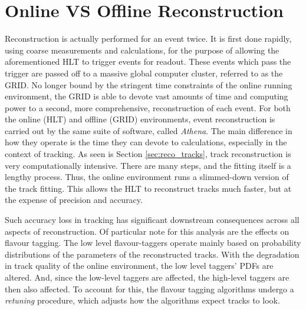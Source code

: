     \section{Online VS Offline Reconstruction}

        Reconstruction is actually performed for an event twice.
        It is first done rapidly, using coarse measurements and calculations,
            for the purpose of allowing the aforementioned HLT to trigger events for readout.
        These events which pass the trigger are passed off to a massive global computer cluster, referred to as the GRID.
        No longer bound by the stringent time constraints of the online running environment,
            the GRID is able to devote vast amounts of time and computing power to a second, 
            more comprehensive, reconstruction of each event.
        For both the online (HLT) and offline (GRID) environments, event reconstruction is carried out by the same suite of software,
            called \textit{Athena}.
        The main difference in how they operate is the time they can devote to calculations, especially in the context of tracking.
        As seen is Section \ref{sec:reco_tracks}, track reconstruction is very computationally intensive.
        There are many steps, and the fitting itself is a lengthy process.
        Thus, the online environment runs a slimmed-down version of the track fitting.
        This allows the HLT to reconstruct tracks much faster, but at the expense of precision and accuracy.

        Such accuracy loss in tracking has significant downstream consequences across all aspects of reconstruction.
        Of particular note for this analysis are the effects on flavour tagging.
        The low level flavour-taggers operate mainly based on probability distributions of the parameters of the reconstructed tracks.
        With the degradation in track quality of the online environment, the low level taggers' PDFs are altered.
        And, since the low-level taggers are affected, the high-level taggers are then also affected.
        To account for this, the flavour tagging algorithms undergo a \textit{retuning} procedure, 
            which adjusts how the algorithms expect tracks to look.

